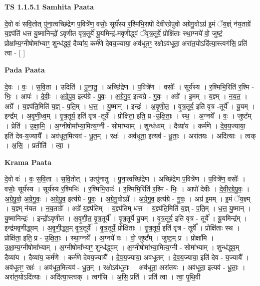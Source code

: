 \documentclass[17pt]{extarticle}
\begin{document}
\textbf{TS 1.1.5.1 } \newline
\textbf{Samhita Paata} \newline

दे॒वो वः॑ सवि॒तोत् पु॑ना॒त्वच्छि॑द्रेण प॒वित्रे॑ण॒ वसोः॒ सूर्य॑स्य र॒श्मिभि॒रापो॑ देवीरग्रेपुवो अग्रेगु॒वोऽग्र॑ इ॒मं ॅय॒ज्ञ्ं न॑य॒ताग्रे॑ य॒ज्ञ्प॑तिं धत्त यु॒ष्मानिन्द्रो॑ ऽवृणीत वृत्र॒तूर्ये॑ यू॒यमिन्द्र॑-मवृणीद्ध्वं ॅवृत्र॒तूर्ये॒ प्रोक्षि॑ताः स्था॒ग्नये॑ वो॒ जुष्टं॒ प्रोक्षा᳚म्य॒ग्नीषोमा᳚भ्याꣳ॒॒ शुन्ध॑द्ध्वं॒ दैव्या॑य॒ कर्म॑णे देवय॒ज्याया॒ अव॑धूतꣳ॒॒ रक्षोऽव॑धूता॒ अरा॑त॒योऽदि॑त्या॒स्त्वग॑सि॒ प्रति॑ त्वा - [ ] \newline

\textbf{Pada Paata} \newline

दे॒वः । वः॒ । स॒वि॒ता । उदिति॑ । पु॒ना॒तु॒ । अच्छि॑द्रेण । प॒वित्रे॑ण । वसोः᳚ । सूर्य॑स्य । र॒श्मिभि॒रिति॑ र॒श्मि - भिः॒ । आपः॑ । दे॒वीः॒ । अ॒ग्रे॒पु॒व॒ इत्य॑ग्रे - पु॒वः॒ । अ॒ग्रे॒गु॒व॒ इत्य॑ग्रे - गु॒वः॒ । अग्रे᳚ । इ॒मम् । य॒ज्ञ्म् । न॒य॒त॒ । अग्रे᳚ । य॒ज्ञ्प॑ति॒मिति॑ य॒ज्ञ् - प॒ति॒म् । ध॒त्त॒ । यु॒ष्मान् । इन्द्रः॑ । अ॒वृ॒णी॒त॒ । वृ॒त्र॒तूर्य॒ इति॑ वृत्र -तूर्ये᳚ । यू॒यम् । इन्द्र᳚म् । अ॒वृ॒णी॒ध्व॒म् । वृ॒त्र॒तूर्य॒ इति॑ वृत्र -तूर्ये᳚ । प्रोक्षि॑ता॒ इति॒ प्र -उ॒क्षि॒ताः॒ । स्थ॒ । अ॒ग्नये᳚ । वः॒ । जुष्ट᳚म् । प्रेति॑ । उ॒क्षा॒मि॒ । अ॒ग्नीषोमा᳚भ्या॒मित्य॒ग्नी - सोमा᳚भ्याम् । शुन्ध॑ध्वम् । दैव्या॑य । कर्म॑णे । दे॒व॒य॒ज्याया॒ इति॑ देव-य॒ज्यायै᳚ । अव॑धूत॒मित्यव॑ - धू॒त॒म् । रक्षः॑ । अव॑धूता॒ इत्यव॑ - धू॒ताः॒ । अरा॑तयः । अदि॑त्याः । त्वक् । अ॒सि॒ । प्रतीति॑ । त्वा॒ ।  \newline


\textbf{Krama Paata} \newline

दे॒वो वः॑ । वः॒ स॒वि॒ता । स॒वि॒तोत् । उत्पु॑नातु । पु॒ना॒त्वच्छि॑द्रेण । अच्छि॑द्रेण प॒वित्रे॑ण । प॒वित्रे॑ण॒ वसोः᳚ । वसोः॒ सूर्य॑स्य । सूर्य॑स्य र॒श्मिभिः॑ । र॒श्मिभि॒रापः॑ । र॒श्मिभि॒रिति॑ र॒श्मि - भिः॒ । 
आपो॑ देवीः । दे॒वी॒र॒ग्रे॒पु॒वः॒ । अ॒ग्रे॒पु॒वो॒ अ॒ग्रे॒गु॒वः॒ । अ॒ग्रे॒पु॒व॒ इत्य॑ग्रे - पु॒वः॒ । अ॒ग्रे॒गु॒वोऽग्रे᳚ । अ॒ग्रे॒गु॒व॒ 
इत्य॑ग्रे - गु॒वः॒ । अग्र॑ इ॒मम् । इ॒मं ॅय॒ज्ञ्म् । य॒ज्ञ्म् न॑यत । न॒य॒ताग्रे᳚ । अग्रे॑ य॒ज्ञ्प॑तिम् । य॒ज्ञ्प॑तिम् धत्त । य॒ज्ञ्प॑ति॒मिति॑ य॒ज्ञ् - प॒ति॒म् । ध॒त्त॒ यु॒ष्मान् । यु॒ष्मानिन्द्रः॑ । इन्द्रो॑ऽवृणीत । अ॒वृ॒णी॒त॒ वृ॒त्र॒तूर्ये᳚ । वृ॒त्र॒तूर्ये॑ यू॒यम् । वृ॒त्र॒तूर्य॒ इति॑ वृत्र - तूर्ये᳚ । यू॒यमिन्द्र᳚म् । इन्द्र॑मवृणीद्ध्वम् । अ॒वृ॒णी॒द्ध्व॒म् वृ॒त्र॒तूर्ये᳚ । वृ॒त्र॒तूर्ये॒ प्रोक्षि॑ताः । वृ॒त्र॒तूर्य॒ इति॑ वृत्र - तूर्ये᳚ । प्रोक्षि॑ताः स्थ । प्रोक्षि॑ता॒ इति॒ प्र - उ॒क्षि॒ताः॒ । स्था॒ग्नये᳚ । अ॒ग्नये॑ वः । वो॒ जुष्ट᳚म् । जुष्ट॒म् प्र । प्रोक्षा॑मि । उ॒क्षा॒म्य॒ग्नीषोमा᳚भ्याम् । अ॒ग्नीषोमा᳚भ्याꣳ॒॒ शुन्ध॑द्ध्वम् । अ॒ग्नीषोमा᳚भ्या॒मित्य॒ग्नी - सोमा᳚भ्याम् । शुन्ध॑द्ध्व॒म् दैव्या॑य । दैव्या॑य॒ कर्म॑णे । 
कर्म॑णे देवय॒ज्यायै᳚ । दे॒व॒य॒ज्याया॒ अव॑धूतम् । दे॒व॒य॒ज्याया॒ इति॑ देव - य॒ज्यायै᳚ । अव॑धूतꣳ॒॒ रक्षः॑ । अव॑धूत॒मित्यव॑ - धू॒त॒म् । रक्षोऽव॑धूताः । अव॑धूता॒ अरा॑तयः । अव॑धूता॒ इत्यव॑ - धू॒ताः॒ । अरा॑त॒योऽदि॑त्याः । अदि॑त्या॒स्त्वक् । त्वग॑सि । अ॒सि॒ प्रति॑ । 
प्रति॑ त्वा । त्वा॒ पृ॒थि॒वी \newline
\end{document}
